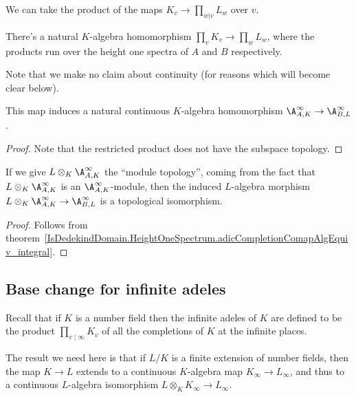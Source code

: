 We can take the product of the maps $K_v\to\prod_{w|v}L_w$ over $v$.

\begin{definition}
  \label{DedekindDomain.ProdAdicCompletions.baseChange}
  There's a natural $K$-algebra homomorphism $\prod_v K_v\to\prod_w L_w$, where the
  products run over the height one spectra of $A$ and $B$ respectively.
\end{definition}

Note that we make no claim about continuity (for reasons which will become clear below).

\begin{theorem} This map induces a natural continuous $K$-algebra homomorphism
  $\A_{A,K}^\infty\to\A_{B,L}^\infty$.
  \label{DedekindDomain.FiniteAdeleRing.baseChange}
  \leanok
\end{theorem}
\begin{proof}
  Note that the restricted product does not have the subspace topology.
\end{proof}

\begin{theorem}
  \label{DedekindDomain.FiniteAdeleRing.baseChangeEquiv}
  \leanok
  If we give $L\otimes_K\A_{A,K}^\infty$ the ``module topology'', coming from the fact
  that $L\otimes_K\A_{A,K}^\infty$ is an $\A_{A,K}^\infty$-module, then the induced
  $L$-algebra morphism
  $L\otimes_K\A_{A,K}^\infty\to\A_{B,L}^\infty$ is a topological isomorphism.
\end{theorem}
\begin{proof}
  Follows from theorem~\ref{IsDedekindDomain.HeightOneSpectrum.adicCompletionComapAlgEquiv_integral}.
\end{proof}

\subsection{Base change for infinite adeles}

Recall that if $K$ is a number field then the infinite adeles of $K$ are defined
to be the product $\prod_{v\mid\infty} K_v$ of all the completions of $K$ at the
infinite places.

The result we need here is that if $L/K$ is a finite extension of number fields,
then the map $K\to L$ extends to a continuous $K$-algebra map $K_\infty\to L_\infty$,
and thus to a continuous $L$-algebra isomorphism $L\otimes_KK_\infty\to L_\infty$.

